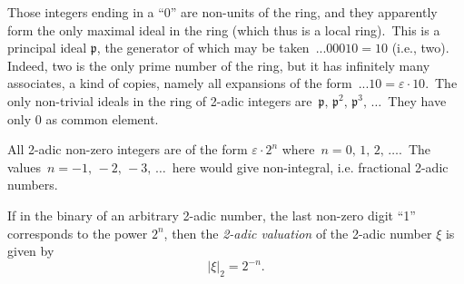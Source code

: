 \documentclass[12pt]{article}
\begin{document}
Those integers ending in a ``0'' are non-units of the ring, and they apparently form the only maximal ideal in the ring (which thus is a local ring).\, This is a principal ideal $\mathfrak{p}$, the generator of which may be taken\, $...00010 = 10$ (i.e., two).\, Indeed, two is the only prime number of the ring, but it has infinitely many associates, a kind of copies, namely all expansions of the form\, $...10 = \varepsilon\cdot 10$.\, The only non-trivial ideals in the ring of 2-adic integers are\, $\mathfrak{p},\, \mathfrak{p}^2,\, \mathfrak{p}^3,\, \ldots$\, They have only 0 as common element.

All 2-adic non-zero integers are of the form $\varepsilon\cdot 2^n$ where\, $n = 0,\,1,\,2,\,\ldots$.\, The values\, $n = -1,\,-2,\,-3,\,\ldots$\, here would give non-integral, i.e. fractional 2-adic numbers.

If in the binary  of an arbitrary 2-adic number, the last non-zero digit ``1'' corresponds to the power $2^n$, then the {\em 2-adic valuation} of the 2-adic number $\xi$ is given by
    $$|\xi|_2 = 2^{-n}.$$
\end{document}
